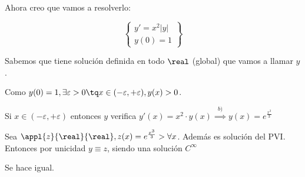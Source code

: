 \documentclass[nochap]{apuntes}
\begin{document}
\begin{problem}[2]
Ahora creo que vamos a resolverlo:

\[\left\{\begin{array}{c}
y'=x^2|y|\\y(0)=1
\end{array}\right\}\]

Sabemos que tiene solución definida en todo $\real$ (global) que vamos a llamar $y$.

Como $y(0)=1, \exists \varepsilon > 0\tq x\in(-\varepsilon,+\varepsilon), y(x)>0$.

Si $x\in(-\varepsilon,+\varepsilon)$ entonces $y$ verifica $y'(x) = x^2\cdot y(x) \overset{b)}{\implies} y(x) = e^{\frac{x^3}{3}}$

Sea $\appl{z}{\real}{\real}, z(x)=e^{\frac{x^3}{3}} > \forall x$. Además es solución del PVI. Entonces por unicidad $y\equiv z$, siendo una solución $C^{\infty}$

\spart Se hace igual.

\end{problem}
\end{document}
